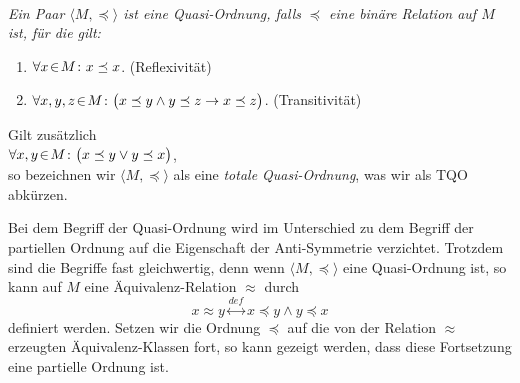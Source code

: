 \begin{Definition}  \hspace*{\fill} \\
{\em
  Ein Paar $\langle M, \preceq\rangle$ ist eine \emph{Quasi-Ordnung}, falls $\preceq$ eine
  bin\"are Relation auf $M$ ist, f\"ur die gilt:
  \begin{enumerate}
  \item $\forall x \!\in\! M \colon x \preceq x$. \hspace*{\fill} (Reflexivit\"at)
  \item $\forall x, y, z \!\in\! M \colon \bigl(x \preceq y \wedge y \preceq z \rightarrow x \preceq z\bigr)$. 
         \hspace*{\fill} (Transitivit\"at)
  \end{enumerate}
  Gilt zus\"atzlich \\[0.2cm]
  \hspace*{1.3cm} $\forall x, y \!\in\! M \colon \bigl(x \preceq y \vee y \preceq x\bigr)$, \\[0.2cm]
  so bezeichnen wir $\langle M, \preceq \rangle$ als eine \emph{totale Quasi-Ordnung}, was
  wir als \textsc{TQO} abk\"urzen.
}
\end{Definition}
Bei dem Begriff der Quasi-Ordnung wird im Unterschied zu dem Begriff der partiellen Ordnung auf die
Eigenschaft der Anti-Symmetrie verzichtet.  Trotzdem sind die Begriffe fast gleichwertig, denn wenn
$\langle M, \preceq \rangle$ eine Quasi-Ordnung ist, so kann auf $M$ eine \"Aquivalenz-Relation
$\approx$ durch 
\[ x \approx y \stackrel{def}{\longleftrightarrow} x \preceq y \wedge y \preceq x \]
definiert werden.
Setzen wir die Ordnung $\preceq$ auf die von der Relation $\approx$ erzeugten \"Aquivalenz-Klassen
fort,  so kann gezeigt werden, dass diese Fortsetzung eine partielle Ordnung ist.
\vspace*{0.3cm}

